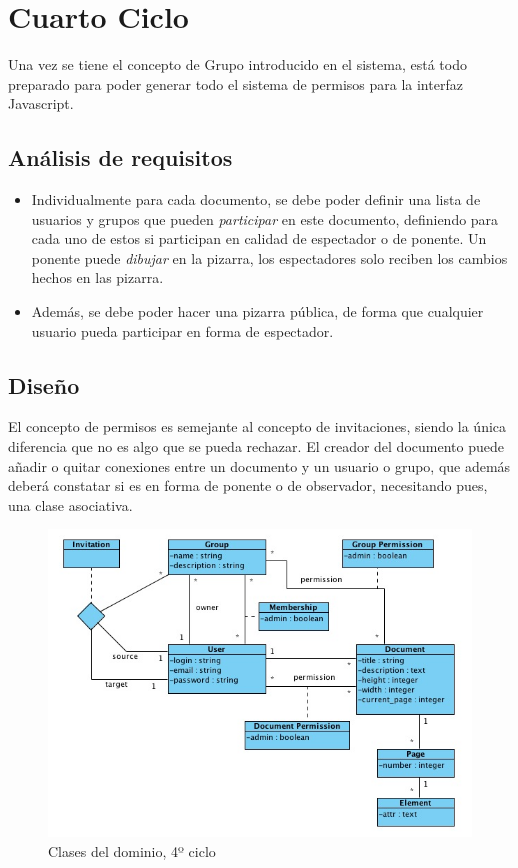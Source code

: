 \section{Cuarto Ciclo} %
\label{sec:cuarto_ciclo}

Una vez se tiene el concepto de Grupo introducido en el sistema, está todo preparado para poder generar todo el sistema de permisos para la interfaz Javascript.

\subsection{Análisis de requisitos} %
\label{sub:análisis_de_requisitos}

\begin{itemize}
  \item Individualmente para cada documento, se debe poder definir una lista de usuarios y grupos que pueden \emph{participar} en este documento, definiendo para cada uno de estos si participan en calidad de espectador o de ponente. Un ponente puede \emph{dibujar} en la pizarra, los espectadores solo reciben los cambios hechos en las pizarra.
  \item Además, se debe poder hacer una pizarra pública, de forma que cualquier usuario pueda participar en forma de espectador.
\end{itemize}


\subsection{Diseño} %
\label{sub:diseño}

El concepto de permisos es semejante al concepto de invitaciones, siendo la única diferencia que no es algo que se pueda rechazar. El creador del documento puede añadir o quitar conexiones entre un documento y un usuario o grupo, que además deberá constatar si es en forma de ponente o de observador, necesitando pues, una clase asociativa.

\begin{figure}[h!]
\centering
\includegraphics[width=14cm]{uml4.png}
\caption{Clases del dominio, 4º ciclo}\label{fig:uml4}
\end{figure}

